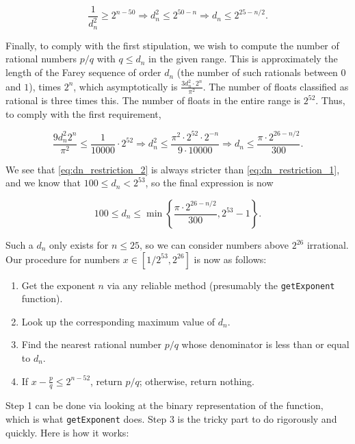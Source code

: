 \documentclass{article}
\begin{document}
$$\frac{1}{d_n^2} \geq 2^{n-50}\Longrightarrow d_n^2 \leq 2^{50-n}\Longrightarrow d_n \leq 2^{25 - n/2}. \label{eq:dn_restriction_1}$$

Finally, to comply with the first stipulation, we wish to compute the number of rational numbers $p/q$ with $q \leq d_n$ in the given range. This is approximately the length of the Farey sequence of order $d_n$ (the number of such rationals between $0$ and $1$), times $2^n$, which asymptotically is $\frac{3d_n^2\cdot 2^n}{\pi^2}$. The number of floats classified as rational is three times this. The number of floats in the entire range is $2^{52}$. Thus, to comply with the first requirement,

$$\frac{9d_n^2 2^n}{\pi^2} \leq \frac{1}{10000}\cdot 2^{52}\Longrightarrow d_n^2 \leq \frac{\pi^2\cdot 2^{52}\cdot 2^{-n}}{9\cdot 10000} \Longrightarrow d_n \leq \frac{\pi\cdot 2^{26 - n/2}}{300}. \label{eq:dn_restriction_2}$$

We see that \eqref{eq:dn_restriction_2} is always stricter than \eqref{eq:dn_restriction_1}, and we know that $100 \leq d_n < 2^{53}$, so the final expression is now

$$\boxed{100 \leq d_n \leq \min \left\{ \frac{\pi\cdot 2^{26 - n/2}}{300}, 2^{53} - 1\right\}}.$$

Such a $d_n$ only exists for $n \leq 25$, so we can consider numbers above $2^26$ irrational. Our procedure for numbers $x\in [1/2^{53}, 2^26]$ is now as follows:

\begin{enumerate}
\item Get the exponent $n$ via any reliable method (presumably the \texttt{getExponent} function).
\item Look up the corresponding maximum value of $d_n$.
\item Find the nearest rational number $p/q$ whose denominator is less than or equal to $d_n$.
\item If $x-\frac{p}{q}\leq 2^{n-52}$, return $p/q$; otherwise, return nothing.
\end{enumerate}

Step 1 can be done via looking at the binary representation of the function, which is what \texttt{getExponent} does. Step 3 is the tricky part to do rigorously and quickly. Here is how it works:
\end{document}
